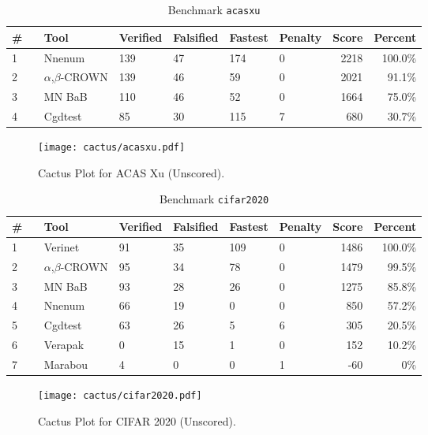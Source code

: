 

\begin{table}[h]
\begin{center}
\caption{Benchmark \texttt{acasxu}} \label{tab:cat_{cat}}
{\setlength{\tabcolsep}{2pt}
\begin{tabular}[h]{@{}llllllrr@{}}
\toprule
\textbf{\# ~} & \textbf{Tool} & \textbf{Verified} & \textbf{Falsified} & \textbf{Fastest} & \textbf{Penalty} & \textbf{Score} & \textbf{Percent}\\
\midrule
1 & Nnenum & 139 & 47 & 174 & 0 & 2218 & 100.0\% \\
2 & $\alpha$,$\beta$-CROWN & 139 & 46 & 59 & 0 & 2021 & 91.1\% \\
3 & MN BaB & 110 & 46 & 52 & 0 & 1664 & 75.0\% \\
4 & Cgdtest & 85 & 30 & 115 & 7 & 680 & 30.7\% \\
\bottomrule
\end{tabular}
}
\end{center}
\end{table}



\begin{figure}[h]
\centerline{\texttt{[image: cactus/acasxu.pdf]}}
\caption{Cactus Plot for ACAS Xu (Unscored).}
\label{fig:quantPic}
\end{figure}



\begin{table}[h]
\begin{center}
\caption{Benchmark \texttt{cifar2020}} \label{tab:cat_{cat}}
{\setlength{\tabcolsep}{2pt}
\begin{tabular}[h]{@{}llllllrr@{}}
\toprule
\textbf{\# ~} & \textbf{Tool} & \textbf{Verified} & \textbf{Falsified} & \textbf{Fastest} & \textbf{Penalty} & \textbf{Score} & \textbf{Percent}\\
\midrule
1 & Verinet & 91 & 35 & 109 & 0 & 1486 & 100.0\% \\
2 & $\alpha$,$\beta$-CROWN & 95 & 34 & 78 & 0 & 1479 & 99.5\% \\
3 & MN BaB & 93 & 28 & 26 & 0 & 1275 & 85.8\% \\
4 & Nnenum & 66 & 19 & 0 & 0 & 850 & 57.2\% \\
5 & Cgdtest & 63 & 26 & 5 & 6 & 305 & 20.5\% \\
6 & Verapak & 0 & 15 & 1 & 0 & 152 & 10.2\% \\
7 & Marabou & 4 & 0 & 0 & 1 & -60 & 0\% \\
\bottomrule
\end{tabular}
}
\end{center}
\end{table}



\begin{figure}[h]
\centerline{\texttt{[image: cactus/cifar2020.pdf]}}
\caption{Cactus Plot for CIFAR 2020 (Unscored).}
\label{fig:quantPic}
\end{figure}

